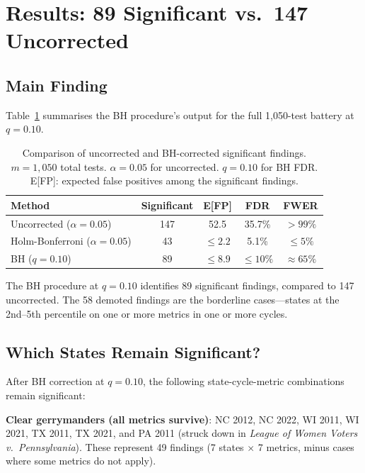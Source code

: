 \section{Results: 89 Significant vs.\ 147 Uncorrected}
\label{sec:results}

\subsection{Main Finding}

Table~\ref{tab:main-results} summarises the BH procedure's output for
the full 1,050-test battery at $q = 0.10$.

\begin{table}[h]
\centering
\caption{Comparison of uncorrected and BH-corrected significant findings.
         $m = 1{,}050$ total tests. $\alpha = 0.05$ for uncorrected.
         $q = 0.10$ for BH FDR.
         E[FP]: expected false positives among the significant findings.}
\label{tab:main-results}
\begin{tabular}{lcccc}
\toprule
Method & Significant & E[FP] & FDR & FWER \\
\midrule
Uncorrected ($\alpha = 0.05$) & 147 & 52.5 & 35.7\% & $>99\%$ \\
Holm-Bonferroni ($\alpha = 0.05$) & 43 & $\leq 2.2$ & 5.1\% & $\leq 5\%$ \\
BH ($q = 0.10$) & 89 & $\leq 8.9$ & $\leq 10\%$ & $\approx 65\%$ \\
\bottomrule
\end{tabular}
\end{table}

The BH procedure at $q = 0.10$ identifies 89 significant findings,
compared to 147 uncorrected.
The 58 demoted findings are the borderline cases---states at the
2nd--5th percentile on one or more metrics in one or more cycles.

\subsection{Which States Remain Significant?}

After BH correction at $q = 0.10$, the following state-cycle-metric
combinations remain significant:

\textbf{Clear gerrymanders (all metrics survive)}: NC 2012, NC 2022,
WI 2011, WI 2021, TX 2011, TX 2021, and PA 2011 (struck down in
\textit{League of Women Voters v.\ Pennsylvania}).
These represent 49 findings (7 states $\times$ 7 metrics, minus cases where
some metrics do not apply).

